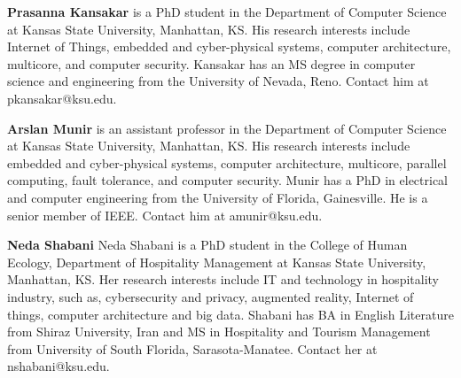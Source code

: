 \documentclass[10pt,journal,letterpaper]{IEEEtran}
\begin{document}
{%

\vspace{8mm}

\noindent \textbf{Prasanna Kansakar} is a PhD student in the Department of Computer Science at Kansas State University, Manhattan, KS. His research interests include Internet of Things, embedded and cyber-physical systems, computer architecture, multicore, and computer security. Kansakar has an MS degree in computer science and engineering from the University of Nevada, Reno. Contact him at pkansakar@ksu.edu.

\vspace{8mm}

\noindent \textbf{Arslan Munir} is an assistant professor in the Department of Computer Science at Kansas State University, Manhattan, KS. His research interests include embedded and cyber-physical systems, computer architecture, multicore, parallel computing, fault tolerance, and computer security. Munir has a PhD in electrical and computer engineering from the University of Florida, Gainesville. He is a senior member of IEEE. Contact him at amunir@ksu.edu.

\vspace{8mm}

\noindent \textbf{Neda Shabani} Neda Shabani is a PhD student in the College of Human Ecology, Department of Hospitality Management at Kansas State University, Manhattan, KS. Her research interests include IT and technology in hospitality industry, such as, cybersecurity and privacy, augmented reality, Internet of things, computer architecture and big data. Shabani has BA in English Literature from Shiraz University, Iran and MS in Hospitality and Tourism Management from University of South Florida, Sarasota-Manatee. Contact her at nshabani@ksu.edu.


{
\balance


}

\fussy
} %
\end{document}

